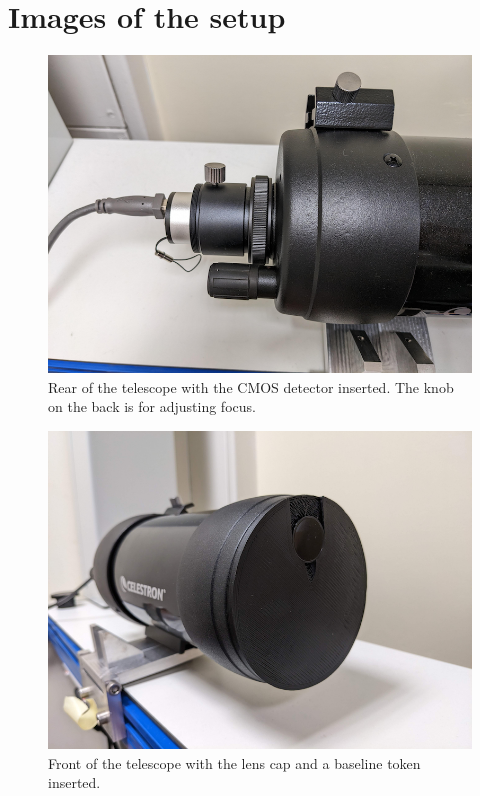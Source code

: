 \documentclass[11pt]{article}
\begin{document}
\clearpage
\appendix

\section{Images of the setup}

\begin{figure}[h]
    \centering
    \includegraphics[width=1\textwidth]{doc/tel.png}
    \caption{Rear of the telescope with the CMOS detector inserted. The knob on the back is for adjusting focus.}
    \label{fig:tel}
\end{figure}

\begin{figure}[h]
    \centering
    \includegraphics[width=1\textwidth]{doc/tel2.png}
    \caption{Front of the telescope with the lens cap and a baseline token inserted.}
    \label{fig:tel2}
\end{figure}
\end{document}

